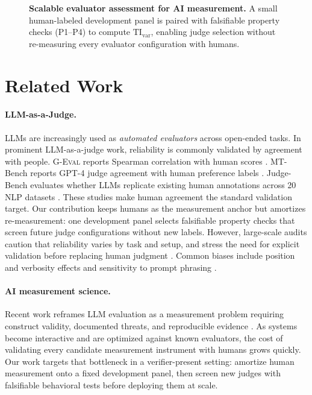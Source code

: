 \documentclass{article}
\begin{document}
\begin{figure}[t]
  \centering
  \resizebox{0.68\linewidth}{!}{}
  \caption{\textbf{Scalable evaluator assessment for AI measurement.} A small human-labeled development panel is paired with falsifiable property checks (P1--P4) to compute \(\mathrm{TI}_{\mathrm{var}}\), enabling judge selection without re-measuring every evaluator configuration with humans.}
  \label{fig:certjudge_overview}
\end{figure}

\section{Related Work}
\paragraph{LLM-as-a-Judge.}
LLMs are increasingly used as \emph{automated evaluators} across open-ended tasks.
In prominent LLM-as-a-judge work, reliability is commonly validated by agreement with people.
\textsc{G-Eval} reports Spearman correlation with human scores \citep{Liu2023GEval}.
MT-Bench reports GPT-4 judge agreement with human preference labels \citep{Zheng2023MTBench}.
Judge-Bench evaluates whether LLMs replicate existing human annotations across 20 NLP datasets \citep{Kocmi2024HumanVsLLM}.
These studies make human agreement the standard validation target.
Our contribution keeps humans as the measurement anchor but amortizes re-measurement: one development panel selects falsifiable property checks that screen future judge configurations without new labels.
However, large-scale audits caution that reliability varies by task and setup, and stress the need for explicit validation before replacing human judgment \citep{Kocmi2024HumanVsLLM,Li2024TrustLLMJudgments}.
Common biases include position and verbosity effects and sensitivity to prompt phrasing \citep{Zheng2023MTBench,Li2024TrustLLMJudgments}.

\paragraph{AI measurement science.}
Recent work reframes LLM evaluation as a measurement problem requiring construct validity, documented threats, and reproducible evidence \citep{salaudeen2025measurement}.
As systems become interactive and are optimized against known evaluators, the cost of validating every candidate measurement instrument with humans grows quickly.
Our work targets that bottleneck in a verifier-present setting: amortize human measurement onto a fixed development panel, then screen new judges with falsifiable behavioral tests before deploying them at scale.
\end{document}
